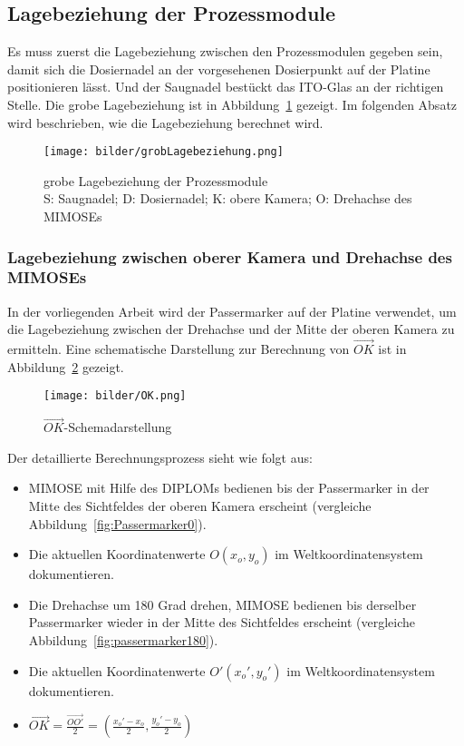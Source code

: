 \subsection{Lagebeziehung der Prozessmodule}
Es muss zuerst die Lagebeziehung zwischen den Prozessmodulen gegeben sein, damit sich die Dosiernadel an der vorgesehenen Dosierpunkt auf der Platine positionieren lässt. Und der Saugnadel bestückt das ITO-Glas an der richtigen Stelle. Die grobe Lagebeziehung ist in Abbildung~\ref{fig:Lagebeziehung} gezeigt. Im folgenden Absatz wird beschrieben, wie die Lagebeziehung berechnet wird.
\begin{figure}[H]
    \centering
    \texttt{[image: bilder/grobLagebeziehung.png]}
    \caption{grobe Lagebeziehung der Prozessmodule \\S: Saugnadel; D: Dosiernadel; K: obere Kamera; O: Drehachse des MIMOSEs}
    \label{fig:Lagebeziehung}
\end{figure}
\subsubsection{Lagebeziehung zwischen oberer Kamera und Drehachse des MIMOSEs}

In der vorliegenden Arbeit wird der Passermarker auf der Platine verwendet, um die Lagebeziehung zwischen der Drehachse und der Mitte der oberen Kamera zu ermitteln. Eine schematische Darstellung zur Berechnung von $\vec{OK}$ ist in Abbildung~\ref{fig:OK} gezeigt.
\begin{figure}[H]
    \centering
    \texttt{[image: bilder/OK.png]}
    \caption{$\vec{OK}$-Schemadarstellung}
    \label{fig:OK}
\end{figure}

Der detaillierte Berechnungsprozess sieht wie folgt aus:

\begin{itemize}
    \item MIMOSE mit Hilfe des DIPLOMs bedienen bis der Passermarker in der Mitte des Sichtfeldes der oberen Kamera erscheint (vergleiche Abbildung~\ref{fig:Passermarker0}).
    \item Die aktuellen Koordinatenwerte $O(x_o, y_o)$ im Weltkoordinatensystem dokumentieren.
    \item Die Drehachse um 180 Grad drehen, MIMOSE bedienen bis derselber Passermarker wieder in der Mitte des Sichtfeldes erscheint (vergleiche Abbildung~\ref{fig:passermarker180}).
    \item Die aktuellen Koordinatenwerte $O'(x_o',  y_o')$ im Weltkoordinatensystem dokumentieren.
    \item $\vec{OK} = \frac{\vec{OO'}}{2} = (\frac{x_o' - x_o}{2}, \frac{y_o' -  y_o}{2})$
\end{itemize}

